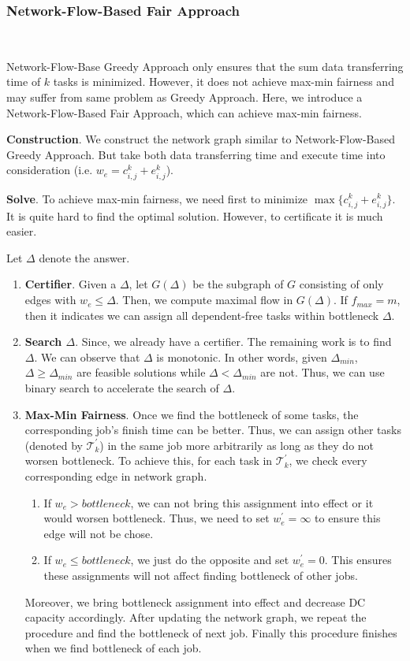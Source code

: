 \subsubsection{Network-Flow-Based Fair Approach}\label{NFBFA}
~

Network-Flow-Base Greedy Approach only ensures that the sum data transferring time of $k$ tasks is minimized. However, it does not achieve max-min fairness and may suffer from same problem as Greedy Approach. Here, we introduce a Network-Flow-Based Fair Approach, which can achieve max-min fairness.

\textbf{Construction}. We construct the network graph similar to Network-Flow-Based Greedy Approach. But take both data transferring time and execute time into consideration (i.e. $w_e=c^k_{i,j}+e^k_{i,j}$).  

\textbf{Solve}. To achieve max-min fairness, we need first to minimize $\max\{c^k_{i,j}+e^k_{i,j}\}$. It is quite hard to find the optimal solution. However, to certificate it is much easier.  

Let $\Delta$ denote the answer.
\begin{enumerate}
    \item \textbf{Certifier}. Given a $\Delta$, let $G(\Delta)$ be the subgraph of $G$ consisting of only edges with $w_e\leq \Delta$. Then, we compute maximal flow in $G(\Delta)$. If $f_{max}=m$, then it indicates we can assign all dependent-free tasks within bottleneck $\Delta$.
    
    \item \textbf{Search $\Delta$}. Since, we already have a certifier. The remaining work is to find $\Delta$. We can observe that $\Delta$ is monotonic. In other words, given $\Delta_{min}$, $\Delta \geq \Delta_{min}$ are feasible solutions while $\Delta < \Delta_{min} $ are not. Thus, we can use binary search to accelerate the search of $\Delta$.
    
    \item \textbf{Max-Min Fairness}. Once we find the bottleneck of some tasks, the corresponding job's finish time can be better. Thus, we can assign other tasks (denoted by $ \mathcal{T}^{'}_{k}$) in the same job more arbitrarily as long as they do not worsen bottleneck. To achieve this, for each task in $ \mathcal{T}^{'}_{k}$, we check every corresponding edge in network graph. 
    \begin{enumerate}
        \item  If $w_e> bottleneck$, we can not bring this assignment into effect or it would worsen bottleneck. Thus, we need to set $w_e^{'}=\infty$ to ensure this edge will not be chose. 
        \item  If $w_e\leq bottleneck$, we just do the opposite and set $w_e^{'}=0$. This ensures these assignments will not affect finding bottleneck of other jobs.
    \end{enumerate}
    Moreover, we bring bottleneck assignment into effect and decrease DC capacity accordingly.
    After updating the network graph, we repeat the procedure and find the bottleneck of next job. Finally this procedure finishes when we find bottleneck of each job.
    
\end{enumerate} 
    
